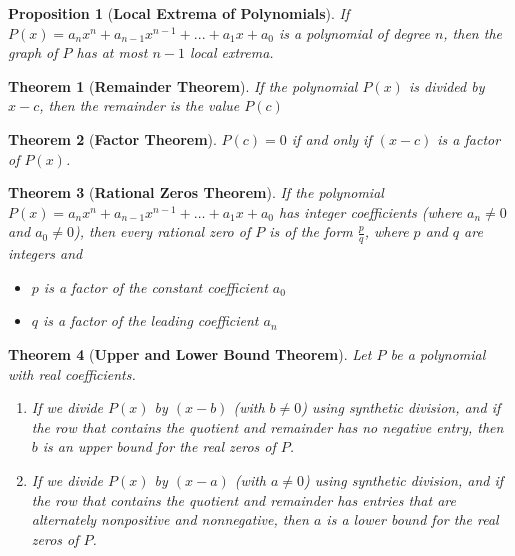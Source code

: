 \documentclass{article}
\theoremstyle{plain}
\newtheorem{theorem}{Theorem}[section]
\newtheorem{proposition}{Proposition}[section]
\begin{document}
\begin{proposition}[\textbf{Local Extrema of Polynomials}]
    If $P(x)=a_nx^n+a_{n-1}x^{n-1}+...+a_1x+a_0$
    is a polynomial of degree $n$, then the graph of $P$ has at most $n-1$ local extrema.
    \cite{stewart2015precalculus}
\end{proposition}

\begin{theorem}[\textbf{Remainder Theorem}]
    If the polynomial $P(x)$ is divided by $x-c$, then the remainder is the value $P(c)$
    \cite{stewart2015precalculus}
\end{theorem}

\begin{theorem}[\textbf{Factor Theorem}]
    \( P(c) = 0 \) if and only if \( (x - c) \) is a factor of \( P(x) \).
    \cite{stewart2015precalculus}
\end{theorem}

\begin{theorem}[\textbf{Rational Zeros Theorem}]
    If the polynomial $P(x) = a_n x^n + a_{n-1} x^{n-1} + \ldots + a_1 x + a_0$ has integer coefficients (where $a_n \neq 0$ and $a_0 \neq 0$), then every rational zero of $P$ is of the form $\frac{p}{q}$, where $p$ and $q$ are integers and
    \begin{itemize}
        \item $p$ is a factor of the constant coefficient $a_0$
        \item $q$ is a factor of the leading coefficient $a_n$
    \end{itemize}
    \cite{stewart2015precalculus}
\end{theorem}

\begin{theorem}[\textbf{Upper and Lower Bound Theorem}]
    Let $P$ be a polynomial with real coefficients.
    \begin{enumerate}
        \item If we divide $P(x)$ by $(x - b)$ (with $b \neq 0$) using synthetic division, and if the row that contains the quotient and remainder has no negative entry, then $b$ is an upper bound for the real zeros of $P$.
        \item If we divide $P(x)$ by $(x - a)$ (with $a \neq 0$) using synthetic division, and if the row that contains the quotient and remainder has entries that are alternately nonpositive and nonnegative, then $a$ is a lower bound for the real zeros of $P$.
    \end{enumerate}
    \cite{stewart2015precalculus}
\end{theorem}





\nocite{*}


\end{document}
